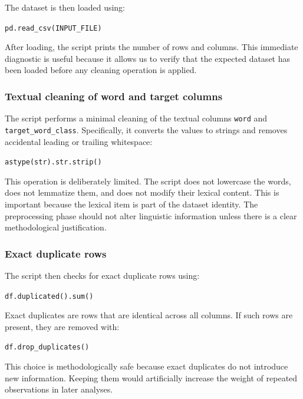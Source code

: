 \documentclass{ipgpmaster}
\begin{document}
The dataset is then loaded using:

\begin{center}
\texttt{pd.read\_csv(INPUT\_FILE)}
\end{center}

After loading, the script prints the number of rows and columns. This immediate diagnostic is useful because it allows us to verify that the expected dataset has been loaded before any cleaning operation is applied.

\subsubsection{Textual cleaning of word and target columns}

The script performs a minimal cleaning of the textual columns \texttt{word} and \texttt{target\_word\_class}. Specifically, it converts the values to strings and removes accidental leading or trailing whitespace:

\begin{center}
\texttt{astype(str).str.strip()}
\end{center}

This operation is deliberately limited. The script does not lowercase the words, does not lemmatize them, and does not modify their lexical content. This is important because the lexical item is part of the dataset identity. The preprocessing phase should not alter linguistic information unless there is a clear methodological justification.

\subsubsection{Exact duplicate rows}

The script then checks for exact duplicate rows using:

\begin{center}
\texttt{df.duplicated().sum()}
\end{center}

Exact duplicates are rows that are identical across all columns. If such rows are present, they are removed with:

\begin{center}
\texttt{df.drop\_duplicates()}
\end{center}

This choice is methodologically safe because exact duplicates do not introduce new information. Keeping them would artificially increase the weight of repeated observations in later analyses.
\end{document}
